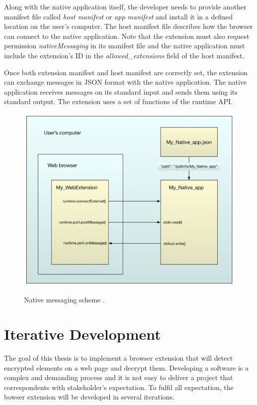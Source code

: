 Along with the native application itself, the developer needs to provide another manifest file called \textit{host manifest} or \textit{app manifest} and install it in a defined location on the user's computer. The host manifest file describes how the browser can connect to the native application. Note that the extension must also request permission \textit{nativeMessaging} in its manifest file and the native application must include the extension's ID in the \textit{allowed\_extensions} field of the host manifest.

Once both extension manifest and host manifest are correctly set, the extension can exchange messages in JSON format with the native application. The native application receives messages on its standard input and sends them using its standard output. The extension uses a set of functions of the runtime API.

\begin{figure}[H]
    \begin{center}
        \label{img:extensionAnatomy}
        \includegraphics[width=1.0\textwidth]{obrazky-figures/native-messaging.png}
        \caption{Native messaging scheme \cite{extensionNativeMessaging}.}
    \end{center}
\end{figure}

\chapter{Iterative Development}
The goal of this thesis is to implement a browser extension that will detect encrypted elements on a web page and decrypt them. Developing a software is a complex and demanding process and it is not easy to deliver a project that correspondents with stakeholder's expectation. To fulfil all expectation, the bowser extension will be developed in several iterations.


